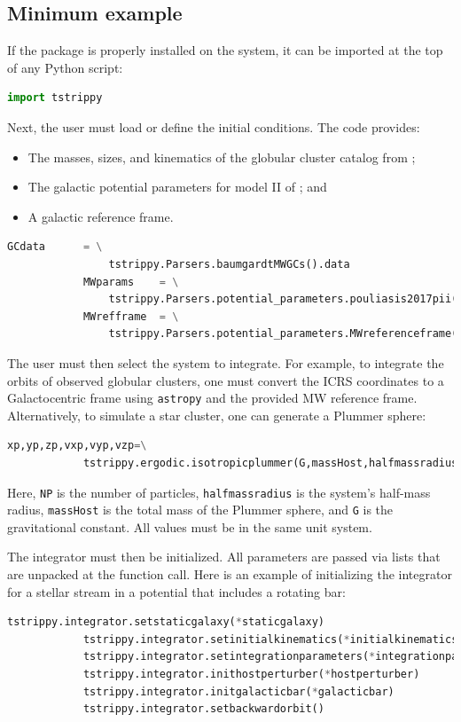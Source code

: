     \subsection{Minimum example}
        If the package is properly installed on the system, it can be imported at the top of any Python script:
        \small
        \begin{lstlisting}[language=python]
            import tstrippy    
        \end{lstlisting}
        \normalsize
        Next, the user must load or define the initial conditions. The code provides:
        \begin{itemize}
            \item The masses, sizes, and kinematics of the globular cluster catalog from \citet{2018MNRAS.478.1520B};
            \item The galactic potential parameters for model II of \citet{2017A&A...598A..66P}; and
            \item A galactic reference frame.
        \end{itemize}

        \small
        \begin{lstlisting}[language=python]
            GCdata      = \
                tstrippy.Parsers.baumgardtMWGCs().data
            MWparams    = \
                tstrippy.Parsers.potential_parameters.pouliasis2017pii()
            MWrefframe  = \
                tstrippy.Parsers.potential_parameters.MWreferenceframe()
        \end{lstlisting}
        \normalsize
        The user must then select the system to integrate. For example, to integrate the orbits of observed globular clusters, one must convert the ICRS coordinates to a Galactocentric frame using \texttt{astropy} and the provided MW reference frame. Alternatively, to simulate a star cluster, one can generate a Plummer sphere:
        \small
        \begin{lstlisting}[language=python]
            xp,yp,zp,vxp,vyp,vzp=\
            tstrippy.ergodic.isotropicplummer(G,massHost,halfmassradius,NP)
        \end{lstlisting}
        Here, \texttt{NP} is the number of particles, \texttt{halfmassradius} is the system's half-mass radius, \texttt{massHost} is the total mass of the Plummer sphere, and \texttt{G} is the gravitational constant. All values must be in the same unit system.

        The integrator must then be initialized. All parameters are passed via lists that are unpacked at the function call. Here is an example of initializing the integrator for a stellar stream in a potential that includes a rotating bar:
        \small
        \begin{lstlisting}[language=python]
            tstrippy.integrator.setstaticgalaxy(*staticgalaxy)
            tstrippy.integrator.setinitialkinematics(*initialkinematics)
            tstrippy.integrator.setintegrationparameters(*integrationparameters)
            tstrippy.integrator.inithostperturber(*hostperturber)
            tstrippy.integrator.initgalacticbar(*galacticbar)
            tstrippy.integrator.setbackwardorbit()
        \end{lstlisting}
        \normalsize

